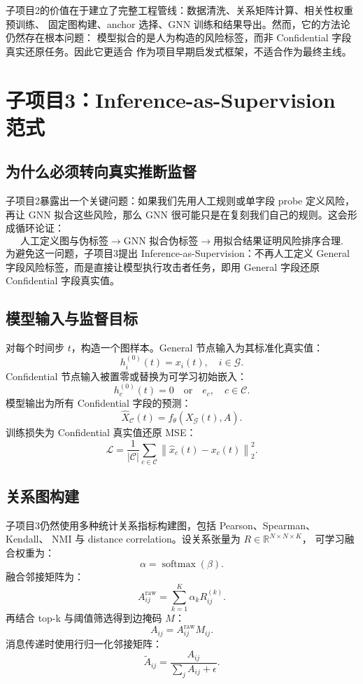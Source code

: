 \documentclass[UTF8,a4paper,11pt]{ctexart}
\begin{document}
子项目2的价值在于建立了完整工程管线：数据清洗、关系矩阵计算、相关性权重预训练、
固定图构建、anchor 选择、GNN 训练和结果导出。然而，它的方法论仍然存在根本问题：
模型拟合的是人为构造的风险标签，而非 Confidential 字段真实还原任务。因此它更适合
作为项目早期启发式框架，不适合作为最终主线。

\section{子项目3：Inference-as-Supervision 范式}

\subsection{为什么必须转向真实推断监督}

子项目2暴露出一个关键问题：如果我们先用人工规则或单字段 probe 定义风险，再让 GNN
拟合这些风险，那么 GNN 很可能只是在复刻我们自己的规则。这会形成循环论证：
\[
  \text{人工定义图与伪标签}
  \rightarrow
  \text{GNN 拟合伪标签}
  \rightarrow
  \text{用拟合结果证明风险排序合理}.
\]
为避免这一问题，子项目3提出 Inference-as-Supervision：不再人工定义 General
字段风险标签，而是直接让模型执行攻击者任务，即用 General 字段还原 Confidential
字段真实值。

\subsection{模型输入与监督目标}

对每个时间步 $t$，构造一个图样本。General 节点输入为其标准化真实值：
\[
  h_i^{(0)}(t) = x_i(t), \quad i \in \mathcal{G}.
\]
Confidential 节点输入被置零或替换为可学习初始嵌入：
\[
  h_c^{(0)}(t) = 0 \quad \text{or} \quad e_c, \quad c \in \mathcal{C}.
\]
模型输出为所有 Confidential 字段的预测：
\[
  \hat{X}_{\mathcal{C}}(t) = f_{\theta}(X_{\mathcal{G}}(t), A).
\]
训练损失为 Confidential 真实值还原 MSE：
\[
  \mathcal{L}
  =
  \frac{1}{|\mathcal{C}|}
  \sum_{c \in \mathcal{C}}
  \left\|\hat{x}_c(t) - x_c(t)\right\|_2^2.
\]

\subsection{关系图构建}

子项目3仍然使用多种统计关系指标构建图，包括 Pearson、Spearman、Kendall、
NMI 与 distance correlation。设关系张量为 $R \in \mathbb{R}^{N \times N \times K}$，
可学习融合权重为：
\[
  \alpha = \operatorname{softmax}(\beta).
\]
融合邻接矩阵为：
\[
  A_{ij}^{\text{raw}}
  =
  \sum_{k=1}^{K} \alpha_k R_{ij}^{(k)}.
\]
再结合 top-k 与阈值筛选得到边掩码 $M$：
\[
  A_{ij} = A_{ij}^{\text{raw}} M_{ij}.
\]
消息传递时使用行归一化邻接矩阵：
\[
  \tilde{A}_{ij}
  =
  \frac{A_{ij}}{\sum_j A_{ij} + \epsilon}.
\]
\end{document}
